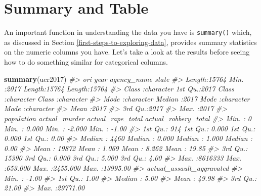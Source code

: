 \documentclass[
  12pt,
]{book}
\newenvironment{Shaded}{\begin{snugshade}}{\end{snugshade}}
\newcommand{\CommentTok}[1]{\textcolor[rgb]{0.37,0.37,0.37}{\textit{#1}}}
\newcommand{\KeywordTok}[1]{\textcolor[rgb]{0.27,0.27,0.27}{\textbf{#1}}}
\newcommand{\NormalTok}[1]{#1}
\begin{document}
\hypertarget{summary-and-table}{%
\section{Summary and Table}\label{summary-and-table}}

An important function in understanding the data you have is \texttt{summary()} which, as discussed in Section \ref{first-steps-to-exploring-data}, provides summary statistics on the numeric columns you have. Let's take a look at the results before seeing how to do something similar for categorical columns.

\begin{Shaded}
\begin{Highlighting}[]
\KeywordTok{summary}\NormalTok{(ucr2017)}
\CommentTok{\#\textgreater{}      ori                 year      agency\_name           state          }
\CommentTok{\#\textgreater{}  Length:15764       Min.   :2017   Length:15764       Length:15764      }
\CommentTok{\#\textgreater{}  Class :character   1st Qu.:2017   Class :character   Class :character  }
\CommentTok{\#\textgreater{}  Mode  :character   Median :2017   Mode  :character   Mode  :character  }
\CommentTok{\#\textgreater{}                     Mean   :2017                                        }
\CommentTok{\#\textgreater{}                     3rd Qu.:2017                                        }
\CommentTok{\#\textgreater{}                     Max.   :2017                                        }
\CommentTok{\#\textgreater{}    population      actual\_murder     actual\_rape\_total  actual\_robbery\_total}
\CommentTok{\#\textgreater{}  Min.   :      0   Min.   :  0.000   Min.   :  {-}2.000   Min.   :   {-}1.00    }
\CommentTok{\#\textgreater{}  1st Qu.:    914   1st Qu.:  0.000   1st Qu.:   0.000   1st Qu.:    0.00    }
\CommentTok{\#\textgreater{}  Median :   4460   Median :  0.000   Median :   1.000   Median :    0.00    }
\CommentTok{\#\textgreater{}  Mean   :  19872   Mean   :  1.069   Mean   :   8.262   Mean   :   19.85    }
\CommentTok{\#\textgreater{}  3rd Qu.:  15390   3rd Qu.:  0.000   3rd Qu.:   5.000   3rd Qu.:    4.00    }
\CommentTok{\#\textgreater{}  Max.   :8616333   Max.   :653.000   Max.   :2455.000   Max.   :13995.00    }
\CommentTok{\#\textgreater{}  actual\_assault\_aggravated}
\CommentTok{\#\textgreater{}  Min.   :   {-}1.00         }
\CommentTok{\#\textgreater{}  1st Qu.:    1.00         }
\CommentTok{\#\textgreater{}  Median :    5.00         }
\CommentTok{\#\textgreater{}  Mean   :   49.98         }
\CommentTok{\#\textgreater{}  3rd Qu.:   21.00         }
\CommentTok{\#\textgreater{}  Max.   :29771.00}
\end{Highlighting}
\end{Shaded}
\end{document}
